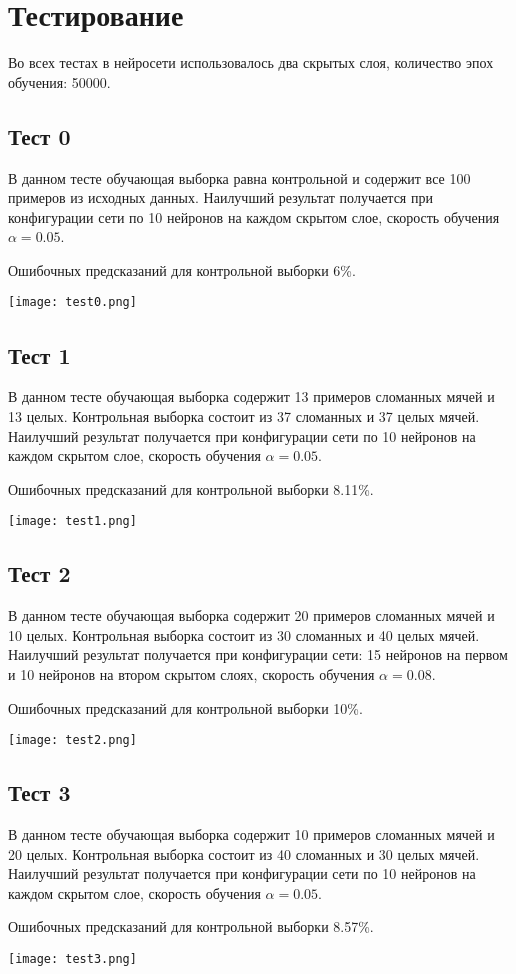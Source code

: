 \section{Тестирование}
	Во всех тестах в нейросети использовалось два скрытых слоя, количество эпох обучения: 50000.
\subsection{Тест 0}
	\parindent=0cm
	В данном тесте обучающая выборка равна контрольной и содержит все 100 примеров из исходных данных.
	Наилучший результат получается при конфигурации сети по 10 нейронов на каждом скрытом слое,
	скорость обучения $\alpha = 0.05$.

	Ошибочных предсказаний для контрольной выборки 6\%.
	\parskip=0cm

	\texttt{[image: test0.png]}
	\parskip=0.2cm


\newpage
\subsection{Тест 1}
	В данном тесте обучающая выборка содержит 13 примеров сломанных мячей и 13 целых.
	Контрольная выборка состоит из 37 сломанных и 37 целых мячей.
	Наилучший результат получается при конфигурации сети по 10 нейронов на каждом скрытом слое,
	скорость обучения $\alpha = 0.05$.

	Ошибочных предсказаний для контрольной выборки 8.11\%.
	\parskip=0cm

	\texttt{[image: test1.png]}
	\parskip=0.2cm

\newpage
\subsection{Тест 2}
	В данном тесте обучающая выборка содержит 20 примеров сломанных мячей и 10 целых.
	Контрольная выборка состоит из 30 сломанных и 40 целых мячей.
	Наилучший результат получается при конфигурации сети: 15 нейронов на первом и 10 нейронов
	на втором скрытом слоях, скорость обучения $\alpha = 0.08$.

	Ошибочных предсказаний для контрольной выборки 10\%.
	\parskip=0cm

	\texttt{[image: test2.png]}
	\parskip=0.2cm

\subsection{Тест 3}
	В данном тесте обучающая выборка содержит 10 примеров сломанных мячей и 20 целых.
	Контрольная выборка состоит из 40 сломанных и 30 целых мячей.
	Наилучший результат получается при конфигурации сети по 10 нейронов на каждом скрытом слое,
	скорость обучения $\alpha = 0.05$.

	Ошибочных предсказаний для контрольной выборки 8.57\%.
	\parskip=0cm

	\texttt{[image: test3.png]}
	\parskip=0.2cm